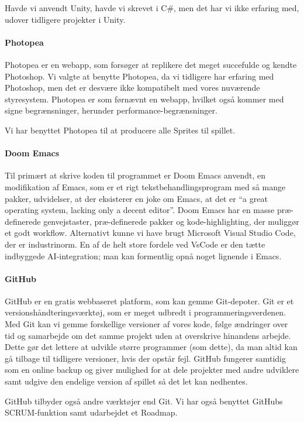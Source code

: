 Havde vi anvendt Unity, havde vi skrevet i C\#, men det har vi ikke erfaring med, udover tidligere projekter i Unity.

\paragraph{Photopea}
Photopea er en webapp, som forsøger at replikere det meget succefulde og kendte Photoshop. Vi valgte at benytte Photopea, da vi tidligere har erfaring med Photoshop, men det er desvære ikke kompatibelt med vores nuværende styresystem. Photopea er som førnævnt en webapp, hvilket også kommer med signe begrænsninger, herunder performance-begrænsninger. 

Vi har benyttet Photopea til at producere alle Sprites til spillet.

\paragraph{Doom Emacs}
Til primært at skrive koden til programmet er Doom Emacs anvendt, en modifikation af Emacs, som er et rigt tekstbehandlingsprogram med så mange pakker, udvidelser, at der eksisterer en joke om Emacs, at det er ``a great operating system, lacking only a decent editor''. Doom Emacs har en masse præ-definerede genvejstaster, præ-definerede pakker og kode-highlighting, der muliggør et godt workflow. Alternativt kunne vi have brugt Microsoft Visual Studio Code, der er industrinorm. En af de helt store fordele ved VsCode er den tætte indbyggede AI-integration; man kan formentlig opnå noget lignende i Emacs.

\paragraph{GitHub}
GitHub er en gratis webbaseret platform, som kan gemme Git-depoter. Git er et versionshåndteringsværktøj, som er meget udbredt i programmeringsverdenen. Med Git kan vi gemme forskellige versioner af vores kode, følge ændringer over tid og samarbejde om det samme projekt uden at overskrive hinandens arbejde. Dette gør det lettere at udvikle større programmer (som dette), da man altid kan gå tilbage til tidligere versioner, hvis der opstår fejl. GitHub fungerer samtidig som en online backup og giver mulighed for at dele projekter med andre udviklere samt udgive den endelige version af spillet så det let kan nedhentes.

GitHub tilbyder også andre værktøjer end Git. Vi har også benyttet GitHubs SCRUM-funktion samt udarbejdet et Roadmap.

